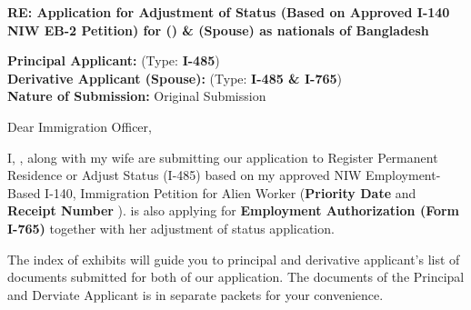\documentclass{letter}
\date{\today}
\begin{document}
% 
\begin{letter}{\USCISaddress

\vspace{0.5cm}

\textbf{RE: Application for Adjustment of Status (Based on Approved I-140 NIW EB-2 Petition)
for \textit{\pApplicant} (\Anum) \& \textit{\dApplicant} (Spouse) as nationals of Bangladesh }
\vspace{0.5cm}

\textbf{Principal Applicant:} \pApplicant  ({Type:} \textbf{I-485})\\
\textbf{Derivative Applicant (Spouse):} \dApplicant  ({Type:} \textbf{I-485 \& I-765})\\
\textbf{Nature of Submission:} Original Submission \\

}






\opening{Dear Immigration Officer,}


I, \textbf{\pApplicant}, along with  my wife \textbf{\dApplicant} are submitting our application to Register Permanent Residence or Adjust Status (I-485) based on my approved NIW Employment-Based I-140, Immigration Petition for Alien Worker (\textbf{Priority Date \priorityDate} and \textbf{Receipt Number \ReceiptNumber}).\textbf{\dApplicant} is also applying for \textbf{Employment Authorization (Form I-765)} together with her adjustment of status application.


The index of exhibits will guide you to principal and derivative applicant's list of documents submitted for both of our application. The documents of the Principal and Derviate Applicant is in separate packets for your convenience.



\end{letter}
\end{document}
